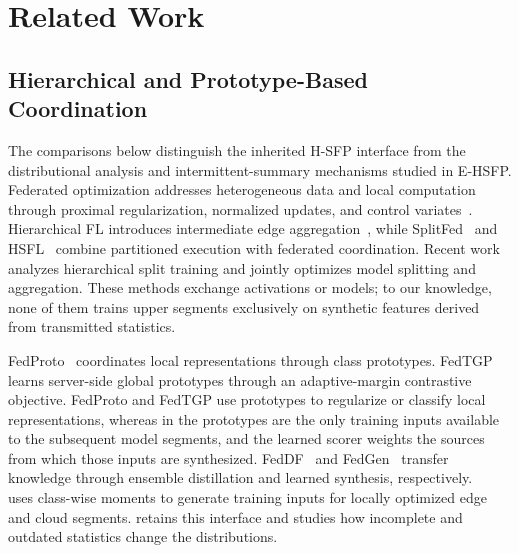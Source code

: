 \section{Related Work}
\label{sec:related}

\subsection{Hierarchical and Prototype-Based Coordination}
The comparisons below distinguish the inherited H-SFP interface from the distributional analysis and intermittent-summary mechanisms studied in E-HSFP.
Federated optimization addresses heterogeneous data and local computation through proximal regularization, normalized updates, and control variates~\cite{li2020federated,10.5555/3495724.3496362,pmlr-v119-karimireddy20a}. Hierarchical FL introduces intermediate edge aggregation~\cite{liu2020client,9488756,rana2022hierarchical}, while SplitFed~\cite{thapa2022splitfed} and HSFL~\cite{quan2023hiersfl} combine partitioned execution with federated coordination. Recent work~\cite{10980018} analyzes hierarchical split training and jointly optimizes model splitting and aggregation. These methods exchange activations or models; to our knowledge, none of them trains upper segments exclusively on synthetic features derived from transmitted statistics.

FedProto~\cite{tan2022fedproto} coordinates local representations through class prototypes. FedTGP~\cite{zhang2024fedtgp} learns server-side global prototypes
through an adaptive-margin contrastive objective. FedProto and FedTGP use prototypes to regularize or classify local representations, whereas in \ehsfp{} the prototypes are the only training inputs available to the subsequent model segments, and the learned scorer weights the sources from which those inputs are synthesized. FedDF~\cite{lin2020ensemble} and FedGen~\cite{zhu2021data} transfer knowledge through ensemble distillation and learned synthesis, respectively. \hsfp{}~\cite{tran2026h} uses class-wise moments to generate training inputs for locally optimized edge and cloud segments. \ehsfp{} retains this interface and studies how incomplete and outdated statistics change the distributions.

